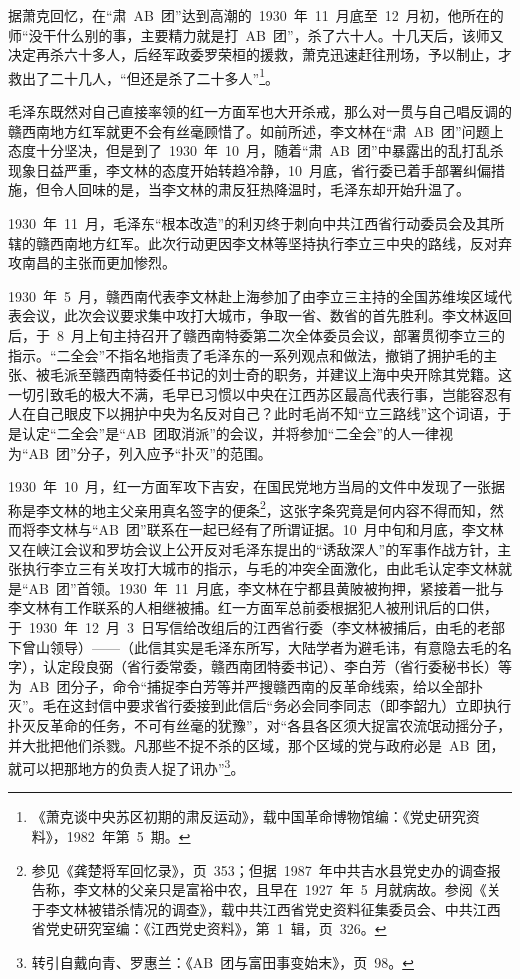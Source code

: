 据萧克回忆，在“肃~AB~团”达到高潮的~1930~年~11~月底至~12~月初，他所在的师“没干什么别的事，主要精力就是打~AB~团”，杀了六十人。十几天后，该师又决定再杀六十多人，后经军政委罗荣桓的援救，萧克迅速赶往刑场，予以制止，才救出了二十几人，“但还是杀了二十多人”\footnote{《萧克谈中央苏区初期的肃反运动》，载中国革命博物馆编：《党史研究资料》，1982~年第~5~期。}。

毛泽东既然对自己直接率领的红一方面军也大开杀戒，那么对一贯与自己唱反调的赣西南地方红军就更不会有丝毫顾惜了。如前所述，李文林在“肃~AB~团”问题上态度十分坚决，但是到了~1930~年~10~月，随着“肃~AB~团”中暴露出的乱打乱杀现象日益严重，李文林的态度开始转趋冷静，10~月底，省行委已着手部署纠偏措施，但令人回味的是，当李文林的肃反狂热降温时，毛泽东却开始升温了。

1930~年~11~月，毛泽东“根本改造”的利刃终于刺向中共江西省行动委员会及其所辖的赣西南地方红军。此次行动更因李文林等坚持执行李立三中央的路线，反对弃攻南昌的主张而更加惨烈。

1930~年~5~月，赣西南代表李文林赴上海参加了由李立三主持的全国苏维埃区域代表会议，此次会议要求集中攻打大城市，争取一省、数省的首先胜利。李文林返回后，于~8~月上旬主持召开了赣西南特委第二次全体委员会议，部署贯彻李立三的指示。“二全会”不指名地指责了毛泽东的一系列观点和做法，撤销了拥护毛的主张、被毛派至赣西南特委任书记的刘士奇的职务，并建议上海中央开除其党籍。这一切引致毛的极大不满，毛早已习惯以中央在江西苏区最高代表行事，岂能容忍有人在自己眼皮下以拥护中央为名反对自己？此时毛尚不知“立三路线”这个词语，于是认定“二全会”是“AB~团取消派”的会议，并将参加“二全会”的人一律视为“AB~团”分子，列入应予“扑灭”的范围。

1930~年~10~月，红一方面军攻下吉安，在国民党地方当局的文件中发现了一张据称是李文林的地主父亲用真名签字的便条\footnote{参见《龚楚将军回忆录》，页~353；但据~1987~年中共吉水县党史办的调查报告称，李文林的父亲只是富裕中农，且早在~1927~年~5~月就病故。参阅《关于李文林被错杀情况的调查》，载中共江西省党史资料征集委员会、中共江西省党史研究室编：《江西党史资料》，第~1~辑，页~326。}，这张字条究竟是何内容不得而知，然而将李文林与“AB~团”联系在一起已经有了所谓证据。10~月中旬和月底，李文林又在峡江会议和罗坊会议上公开反对毛泽东提出的“诱敌深人”的军事作战方针，主张执行李立三有关攻打大城市的指示，与毛的冲突全面激化，由此毛认定李文林就是“AB~团”首领。1930~年~11~月底，李文林在宁都县黄陂被拘押，紧接着一批与李文林有工作联系的人相继被捕。红一方面军总前委根据犯人被刑讯后的口供，于~1930~年~12~月~3~日写信给改组后的江西省行委（李文林被捕后，由毛的老部下曾山领导）——（此信其实是毛泽东所写，大陆学者为避毛讳，有意隐去毛的名字），认定段良弼（省行委常委，赣西南团特委书记）、李白芳（省行委秘书长）等为~AB~团分子，命令“捕捉李白芳等并严搜赣西南的反革命线索，给以全部扑灭”。毛在这封信中要求省行委接到此信后“务必会同李同志（即李韶九）立即执行扑灭反革命的任务，不可有丝毫的犹豫”，对“各县各区须大捉富农流氓动摇分子，并大批把他们杀戮。凡那些不捉不杀的区域，那个区域的党与政府必是~AB~团，就可以把那地方的负责人捉了讯办”\footnote{转引自戴向青、罗惠兰：《AB~团与富田事变始末》，页~98。}。

